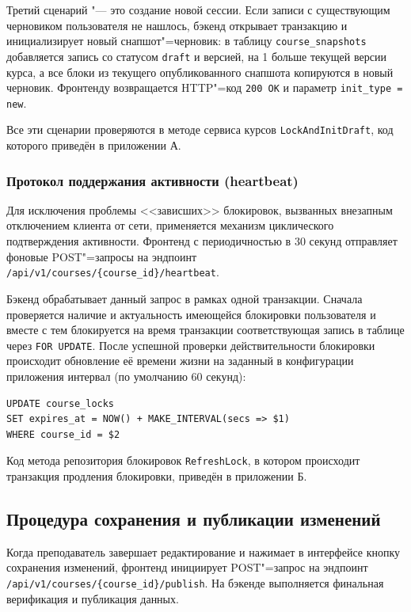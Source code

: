 \documentclass[coursework]{SCWorks}
\begin{document}
Третий сценарий "--- это создание новой сессии. Если записи с существующим черновиком пользователя не нашлось, бэкенд открывает транзакцию и инициализирует новый снапшот"=черновик: в таблицу \texttt{course\_snapshots} добавляется запись со статусом \texttt{draft} и версией, на 1 больше текущей версии курса, а все блоки из текущего опубликованного снапшота копируются в новый черновик. Фронтенду возвращается HTTP"=код \texttt{200 OK} и параметр \texttt{init\_type = new}.

Все эти сценарии проверяются в методе сервиса курсов \texttt{LockAndInitDraft}, код которого приведён в приложении А.

\subsubsection{Протокол поддержания активности (heartbeat)}

Для исключения проблемы <<зависших>> блокировок, вызванных внезапным отключением клиента от сети, применяется механизм циклического подтверждения активности. Фронтенд с периодичностью в 30 секунд отправляет фоновые POST"=запросы на эндпоинт \texttt{/api/v1/courses/\{course\_id\}/heartbeat}.

Бэкенд обрабатывает данный запрос в рамках одной транзакции. Сначала проверяется наличие и актуальность имеющейся блокировки пользователя и вместе с тем блокируется на время транзакции соответствующая запись в таблице через \texttt{FOR UPDATE}. После успешной проверки действительности блокировки происходит обновление её времени жизни на заданный в конфигурации приложения интервал (по умолчанию 60 секунд):

\begin{verbatim}
UPDATE course_locks 
SET expires_at = NOW() + MAKE_INTERVAL(secs => $1) 
WHERE course_id = $2
\end{verbatim}

Код метода репозитория блокировок \texttt{RefreshLock}, в котором происходит транзакция продления блокировки, приведён в приложении Б.

\subsection{Процедура сохранения и публикации изменений}

Когда преподаватель завершает редактирование и нажимает в интерфейсе кнопку сохранения изменений, фронтенд инициирует POST"=запрос на эндпоинт \texttt{/api/v1/courses/\{course\_id\}/publish}. На бэкенде выполняется финальная верификация и публикация данных.
\end{document}
